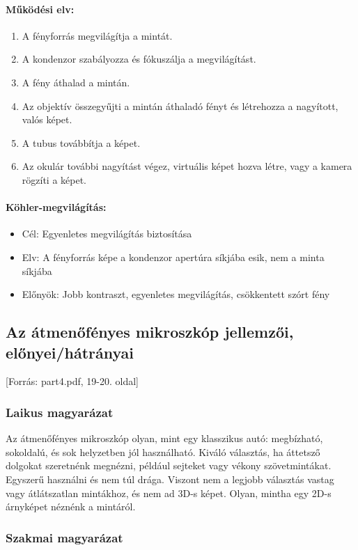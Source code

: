 \documentclass[a4paper,12pt]{article}
\begin{document}
\paragraph{Működési elv:} \begin{enumerate} \item A fényforrás megvilágítja a mintát. \item A kondenzor szabályozza és fókuszálja a megvilágítást. \item A fény áthalad a mintán. \item Az objektív összegyűjti a mintán áthaladó fényt és létrehozza a nagyított, valós képet. \item A tubus továbbítja a képet. \item Az okulár további nagyítást végez, virtuális képet hozva létre, vagy a kamera rögzíti a képet. \end{enumerate}

\paragraph{Köhler-megvilágítás:} \begin{itemize} \item Cél: Egyenletes megvilágítás biztosítása \item Elv: A fényforrás képe a kondenzor apertúra síkjába esik, nem a minta síkjába \item Előnyök: Jobb kontraszt, egyenletes megvilágítás, csökkentett szórt fény \end{itemize}

\subsection{Az átmenőfényes mikroszkóp jellemzői, előnyei/hátrányai} [Forrás: part4.pdf, 19-20. oldal]

\subsubsection{Laikus magyarázat} Az átmenőfényes mikroszkóp olyan, mint egy klasszikus autó: megbízható, sokoldalú, és sok helyzetben jól használható. Kiváló választás, ha áttetsző dolgokat szeretnénk megnézni, például sejteket vagy vékony szövetmintákat. Egyszerű használni és nem túl drága. Viszont nem a legjobb választás vastag vagy átlátszatlan mintákhoz, és nem ad 3D-s képet. Olyan, mintha egy 2D-s árnyképet néznénk a mintáról.

\subsubsection{Szakmai magyarázat}
\end{document}
